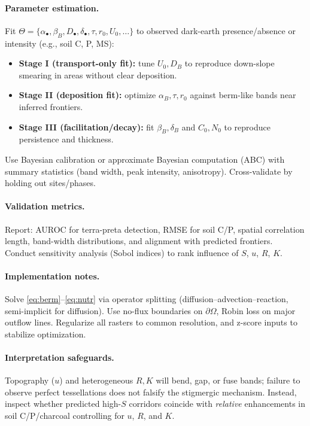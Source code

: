 \documentclass{article}
\begin{document}
\paragraph{Parameter estimation.}
Fit $\Theta=\{\alpha_\bullet,\beta_B,D_\bullet,\delta_\bullet,\tau,r_0,U_0,\ldots\}$ to observed dark-earth presence/absence or intensity (e.g., soil C, P, MS):
\begin{itemize}
\item \textbf{Stage I (transport-only fit):} tune $U_0, D_B$ to reproduce down-slope smearing in areas without clear deposition.
\item \textbf{Stage II (deposition fit):} optimize $\alpha_B,\tau,r_0$ against berm-like bands near inferred frontiers.
\item \textbf{Stage III (facilitation/decay):} fit $\beta_B,\delta_B$ and $C_0,N_0$ to reproduce persistence and thickness.
\end{itemize}
Use Bayesian calibration or approximate Bayesian computation (ABC) with summary statistics (band width, peak intensity, anisotropy). Cross-validate by holding out sites/phases.

\paragraph{Validation metrics.}
Report: AUROC for terra-preta detection, RMSE for soil C/P, spatial correlation length, band-width distributions, and alignment with predicted frontiers. Conduct sensitivity analysis (Sobol indices) to rank influence of $S$, $u$, $R$, $K$.

\paragraph{Implementation notes.}
Solve \eqref{eq:berm}–\eqref{eq:nutr} via operator splitting (diffusion–advection–reaction, semi-implicit for diffusion). Use no-flux boundaries on $\partial\Omega$, Robin loss on major outflow lines. Regularize all rasters to common resolution, and z-score inputs to stabilize optimization.

\paragraph{Interpretation safeguards.}
Topography ($u$) and heterogeneous $R,K$ will bend, gap, or fuse bands; failure to observe perfect tessellations does not falsify the stigmergic mechanism. Instead, inspect whether predicted high-$S$ corridors coincide with \emph{relative} enhancements in soil C/P/charcoal controlling for $u$, $R$, and $K$.
\end{document}
